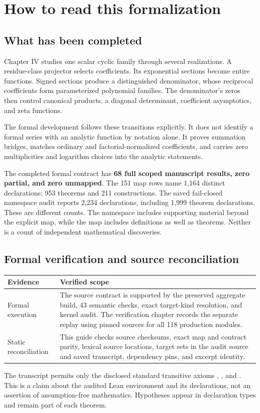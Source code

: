 \section{How to read this formalization}
\subsection{What has been completed}
Chapter IV studies one scalar cyclic family through several realizations. A residue-class projector selects coefficients. Its exponential sections become entire functions. Signed sections produce a distinguished denominator, whose reciprocal coefficients form parameterized polynomial families. The denominator's zeros then control canonical products, a diagonal determinant, coefficient asymptotics, and zeta functions.

The formal development follows these transitions explicitly. It does not identify a formal series with an analytic function by notation alone. It proves summation bridges, matches ordinary and factorial-normalized coefficients, and carries zero multiplicities and logarithm choices into the analytic statements.

The completed formal contract has \textbf{68 full scoped manuscript results, zero partial, and zero unmapped}. The 151 map rows name 1,164 distinct declarations: 953 theorems and 211 constructions. The saved fail-closed namespace audit reports 2,234 declarations, including 1,999 theorem declarations. These are different counts. The namespace includes supporting material beyond the explicit map, while the map includes definitions as well as theorems. Neither is a count of independent mathematical discoveries.

\subsection{Formal verification and source reconciliation}
\begin{longtable}{p{}p{}}
\toprule Evidence & Verified scope \\ \midrule\endhead
Formal execution & The source contract is supported by the preserved aggregate build, 43 semantic checks, exact target-kind resolution, and kernel audit. The verification chapter records the separate replay using pinned sources for all 118 production modules. \\
Static reconciliation & This guide checks source checksums, exact map and contract parity, lexical source locations, target sets in the audit source and saved transcript, dependency pins, and excerpt identity. \\

\bottomrule
\end{longtable}
The transcript permits only the disclosed standard transitive axioms , , and . This is a claim about the audited Lean environment and its declarations, not an assertion of assumption-free mathematics. Hypotheses appear in declaration types and remain part of each theorem.

